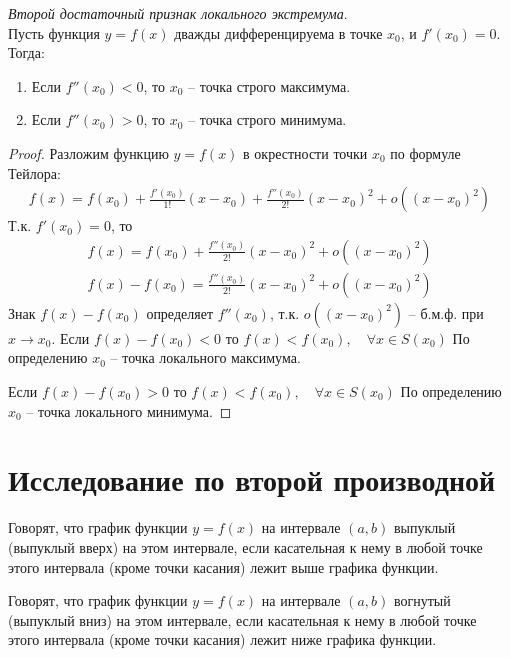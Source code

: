 \begin{theorem}
  \textit{Второй достаточный признак локального экстремума}. \\
  Пусть функция $y = f(x)$ дважды дифференцируема в точке $x_0$, и $f'(x_0) = 0$. Тогда:
   \begin{enumerate}
    \item Если $f''(x_0) < 0$, то $x_0$ -- точка строго максимума. 
    \item Если $f''(x_0) > 0$, то $x_0$ -- точка строго минимума. 
  \end{enumerate}
\end{theorem}
\begin{proof}
  Разложим функцию $y = f(x)$ в окрестности точки $x_0$ по формуле Тейлора:
  \begin{gather*}
    f(x) = f(x_0) + \frac{f'(x_0)}{1!} (x - x_0) + \frac{f''(x_0)}{2!} (x - x_0)^2 + o((x - x_0)^{2})
  \end{gather*}
  Т.к. $f'(x_0) = 0$, то
  \begin{align*}
    f(x) = f(x_0) + \frac{f''(x_0)}{2!}(x - x_0)^2 + o((x - x_0)^2) \\
    f(x) - f(x_0) = \frac{f''(x_0)}{2!}(x - x_0)^2 + o((x - x_0)^2)
  \end{align*}
  Знак $f(x) - f(x_0)$ определяет $f''(x_0)$, т.к. $o((x - x_0)^2)$ -- б.м.ф. при $x \to  x_0$. 
  Если $f(x) - f(x_0) < 0$ то $f(x) < f(x_0), \quad \forall x \in  S(x_0)$
  По определению $x_0$ -- точка локального максимума.

  Если $f(x) - f(x_0) > 0$ то $f(x) < f(x_0), \quad \forall x \in  S(x_0)$
  По определению $x_0$ -- точка локального минимума.
\end{proof}

\section{Исследование по второй производной}

\begin{definition}
  Говорят, что график функции $y = f(x)$ на интервале $(a, b)$ выпуклый (выпуклый вверх) на этом интервале, если касательная к нему в любой точке этого интервала (кроме точки касания) лежит выше графика функции.
\end{definition}

\begin{definition}
  Говорят, что график функции $y = f(x)$ на интервале $(a, b)$ вогнутый (выпуклый вниз) на этом интервале, если касательная к нему в любой точке этого интервала (кроме точки касания) лежит ниже графика функции.
\end{definition}
